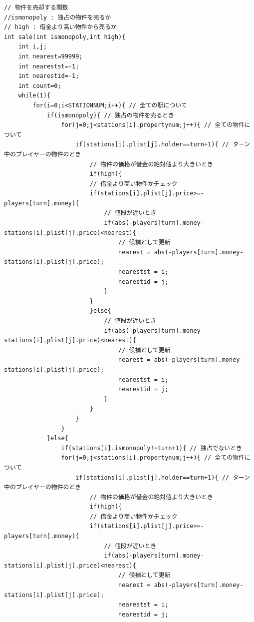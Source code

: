 \documentclass[a4j]{jarticle}
\begin{document}
\begin{lstlisting}[basicstyle=\ttfamily\footnotesize, frame=single,label=code2,caption=game.c]
// 物件を売却する関数
//ismonopoly : 独占の物件を売るか
// high : 借金より高い物件から売るか
int sale(int ismonopoly,int high){
    int i,j;
    int nearest=99999;
    int nearestst=-1;
    int nearestid=-1;
    int count=0;
    while(1){
        for(i=0;i<STATIONNUM;i++){ // 全ての駅について
            if(ismonopoly){ // 独占の物件を売るとき
                for(j=0;j<stations[i].propertynum;j++){ // 全ての物件について
                    if(stations[i].plist[j].holder==turn+1){ // ターン中のプレイヤーの物件のとき
                        // 物件の価格が借金の絶対値より大きいとき
                        if(high){
                        // 借金より高い物件かチェック
                        if(stations[i].plist[j].price>=-players[turn].money){
                            // 値段が近いとき
                            if(abs(-players[turn].money-stations[i].plist[j].price)<nearest){
                                // 候補として更新
                                nearest = abs(-players[turn].money-stations[i].plist[j].price);
                                nearestst = i;
                                nearestid = j;                              
                            }
                        }
                        }else{
                            // 値段が近いとき
                            if(abs(-players[turn].money-stations[i].plist[j].price)<nearest){
                                // 候補として更新
                                nearest = abs(-players[turn].money-stations[i].plist[j].price);
                                nearestst = i;
                                nearestid = j;                              
                            }
                        }
                    }
                }
            }else{
                if(stations[i].ismonopoly!=turn+1){ // 独占でないとき
                for(j=0;j<stations[i].propertynum;j++){ // 全ての物件について
                    if(stations[i].plist[j].holder==turn+1){ // ターン中のプレイヤーの物件のとき
                        // 物件の価格が借金の絶対値より大きいとき
                        if(high){
                        // 借金より高い物件かチェック
                        if(stations[i].plist[j].price>=-players[turn].money){
                            // 値段が近いとき
                            if(abs(-players[turn].money-stations[i].plist[j].price)<nearest){
                                // 候補として更新
                                nearest = abs(-players[turn].money-stations[i].plist[j].price);
                                nearestst = i;
                                nearestid = j;                                 

\end{lstlisting}
\end{document}
